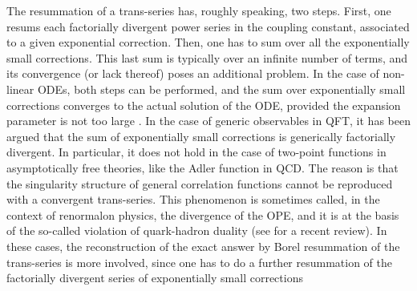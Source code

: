 \documentclass[a4paper,11pt]{article}
\theoremstyle{definition}
\begin{document}
 The resummation of a trans-series has, roughly speaking, two steps. First, one resums each 
 factorially divergent power series in the coupling constant, associated to a given exponential correction. Then, one has to sum 
 over all the exponentially small corrections. This last sum is typically over an infinite number of terms, 
 and its convergence (or lack thereof) poses an 
 additional problem. In the case of non-linear ODEs, both steps can be performed, and the sum over 
 exponentially small corrections converges to the actual solution of the ODE, provided the expansion parameter is not too large \cite{ecalle,costin,costin2}. In the case of generic observables in QFT, it has been argued 
 \cite{shifman,shifman-hadrons, shifman-renormalons} that the sum of exponentially 
 small corrections is generically factorially divergent. In particular, it does not hold in the case of two-point functions in asymptotically free 
theories, like the Adler function in QCD. The reason is that the singularity structure of general 
correlation functions cannot be reproduced with a convergent trans-series. This phenomenon is sometimes called, in the context of 
renormalon physics, the divergence of the OPE, and it is at the basis of the so-called violation 
of quark-hadron duality (see \cite{peris} for a recent review). In these cases, 
the reconstruction of the exact answer by Borel resummation of the trans-series is more involved, 
since one has to do a further resummation of the factorially divergent series of exponentially small corrections
 
\end{document}
